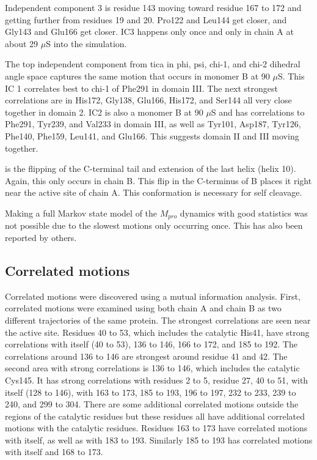 \documentclass{biophys-new}
\begin{document}
Independent component 3 is residue 143 moving toward residue 167 to 172 and getting further from residues 19 and 20. Pro122 and Leu144 get closer, and Gly143 and Glu166 get closer. IC3 happens only once and only in chain A at about 29 $\mu$S into the simulation.

The top independent component from tica in phi, psi, chi-1, and chi-2 dihedral angle space captures the same motion that occurs in monomer B at 90 $\mu$S. This IC 1 correlates best to chi-1 of Phe291 in domain III. The next strongest correlations are in His172, Gly138, Glu166, His172, and Ser144 all very close together in domain 2. IC2 is also a monomer B at 90 $\mu$S and has correlations to Phe291, Tyr239, and Val233 in domain III, as well as Tyr101, Asp187, Tyr126, Phe140, Phe159, Leu141, and Glu166. This suggests domain II and III moving together.

is the flipping of the C-terminal tail and extension of the last helix (helix 10). Again, this only occurs in chain B. This flip in the C-terminus of B places it right near the active site of chain A. This conformation is necessary for self cleavage.\cite{muramatsu2016sars, noske2020crystallographic}

Making a full Markov state model of the $M_{pro}$ dynamics with good statistics was not possible due to the slowest motions only occurring once. This has also been reported by others. \cite{carli2020candidate, cocina2020sapphire}

\subsection*{Correlated motions}

Correlated motions were discovered using a mutual information analysis. First, correlated motions were examined using both chain A and chain B as two different trajectories of the same protein. The strongest correlations are seen near the active site. Residues 40 to 53, which includes the catalytic His41, have strong correlations with itself (40 to 53), 136 to 146, 166 to 172, and 185 to 192. The correlations around 136 to 146 are strongest around residue 41 and 42. The second area with strong correlations is 136 to 146, which includes the catalytic Cys145. It has strong correlations with residues 2 to 5, residue 27, 40 to 51, with itself (128 to 146), with 163 to 173, 185 to 193, 196 to 197, 232 to 233, 239 to 240, and 299 to 304. There are some additional correlated motions outside the regions of the catalytic residues but these residues all have additional correlated motions with the catalytic residues. Residues 163 to 173 have correlated motions with itself, as well as with 183 to 193. Similarly 185 to 193 has correlated motions with itself and 168 to 173.
\end{document}
